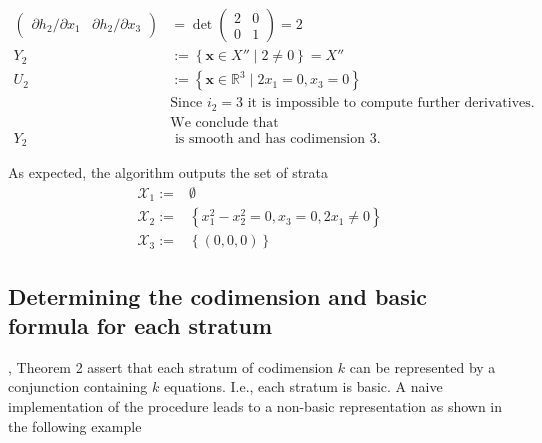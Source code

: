 \documentclass[
]{book}
\theoremstyle{definition}
\theoremstyle{definition}
\theoremstyle{definition}
\theoremstyle{definition}
\theoremstyle{remark}
\begin{document}
\begin{align}
\begin{pmatrix}
\partial h_{2}/\partial x_{1} & \partial h_{2}/\partial x_{3}
\end{pmatrix}&=\det\begin{pmatrix}2 & 0\\
0 & 1
\end{pmatrix}=2\\Y_{2}&:=\left\{ \mathbf{x}\in X''\mid2\ne0\right\} =X''\\U_{2}&:=\left\{ \mathbf{x}\in\mathbb{R}^{3}\mid2x_{1}=0,x_{3}=0\right\} \\&\text{Since }i_{2}=3\text{ it is impossible to compute further derivatives.}\\&\text{We conclude that}\\Y_{2}&\text{ is smooth and has codimension }3.
\end{align}

As expected, the algorithm outputs the set of strata
\begin{align*}
\mathcal{X}_{1}:=&\emptyset\\\mathcal{X}_{2}:=&\left\{ x_{1}^{2}−x_{2}^{2}=0,x_{3}=0,2x_{1}\ne0\right\} \\\mathcal{X}_{3}:=&\left\{ (0,0,0)\right\}
\end{align*}

\hypertarget{determining-the-codimension-and-basic-formula-for-each-stratum}{%
\subsection{Determining the codimension and basic formula for each stratum}\label{determining-the-codimension-and-basic-formula-for-each-stratum}}

\citet{gv1995}, Theorem 2 assert that each stratum of codimension \(k\) can be represented by a conjunction containing \(k\) equations. I.e., each stratum is basic. A naive implementation of the procedure leads to a non-basic representation as shown in the following example
\end{document}

